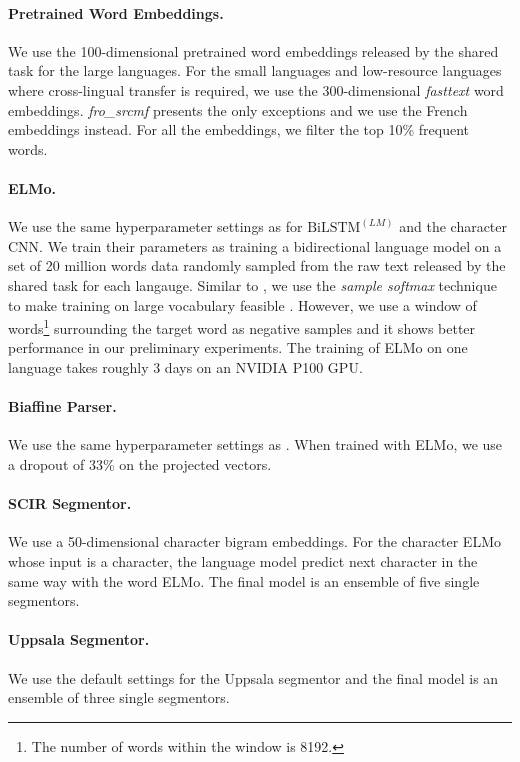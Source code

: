 \documentclass[11pt,a4paper]{article}
\begin{document}
\paragraph{Pretrained Word Embeddings.}
We use the 100-dimensional pretrained word embeddings released by the shared task
for the large languages.
For the small languages and low-resource languages where cross-lingual transfer is required,
we use the 300-dimensional \textit{fasttext} word embeddings.
\textit{fro\_srcmf} presents the only exceptions and we use the French embeddings instead.
For all the embeddings, we filter the top 10\% frequent words.

\paragraph{ELMo.}
We use the same hyperparameter settings as \citet{N18-1202} for $\text{BiLSTM}^{(LM)}$
and the character CNN.
We train their parameters
as training a bidirectional language model
on a set of 20 million words data randomly
sampled from the raw text released by the shared task for each langauge.
Similar to \citet{N18-1202}, we use the \textit{sample softmax} technique
to make training on large vocabulary feasible \cite{jean-EtAl:2015:ACL-IJCNLP}.
However, we use a window of words\footnote{The number of words within the window is 8192.} surrounding the target word
as negative samples and it shows better performance in our preliminary experiments.
The training of ELMo on one language takes roughly 3 days on an NVIDIA P100 GPU.

\paragraph{Biaffine Parser.}
We use the same hyperparameter settings
as \citet{dozat-qi-manning:2017:K17-3}.
When trained with ELMo, we use a dropout of 33\% on the projected vectors.

\paragraph{SCIR Segmentor.}
We use a
50-dimensional character bigram embeddings.
For the character ELMo whose input is a character,
the language model predict next character  in the same way with the word ELMo.
The final model is an ensemble of five single segmentors.

\paragraph{Uppsala Segmentor.}
We use the default settings for the Uppsala segmentor and the
final model is an ensemble of three single segmentors.
\end{document}
